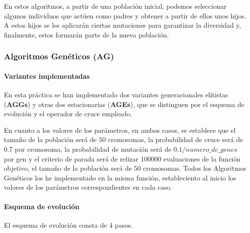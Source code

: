 		En estos algoritmos, a partir de una población inicial, podemos seleccionar algunos individuos que actúen como padres y obtener a partir de ellos unos hijos. A estos
		hijos se les aplicarán ciertas mutaciones para garantizar la diversidad y, finalmente, estos formarán parte de la nueva población.

		\subsubsection{Algoritmos Genéticos (AG)}

		\paragraph{Variantes implementadas}
		$ $\\
		En esta práctica se han implementado dos variantes generacionales elitistas (\textbf{AGGs}) y otras dos estacionarias (\textbf{AGEs}), que se distinguen por el esquema de evolución y el operador de cruce 
		empleado.
		
		En cuanto a los valores de los parámetros, en ambos casos, se establece que el tamaño de la población será de $50$ cromosomas, la probabilidad de cruce será de $0.7$ por cromosoma, la probabilidad de mutación será de $0.1/numero\_de\_genes$ por gen y 
		el criterio de parada será de relizar 100000 evaluaciones de la función objetivo, el tamaño de la población será de $50$ cromosomas.
		Todos los Algoritmos Genéticos los he implementado en la misma función, estableciento al inicio los valores de los parámetros correspondientes en cada caso.
\newpage
		\paragraph{Esquema de evolución}
		$ $\\
		El esquema de evolución consta de 4 pasos.

